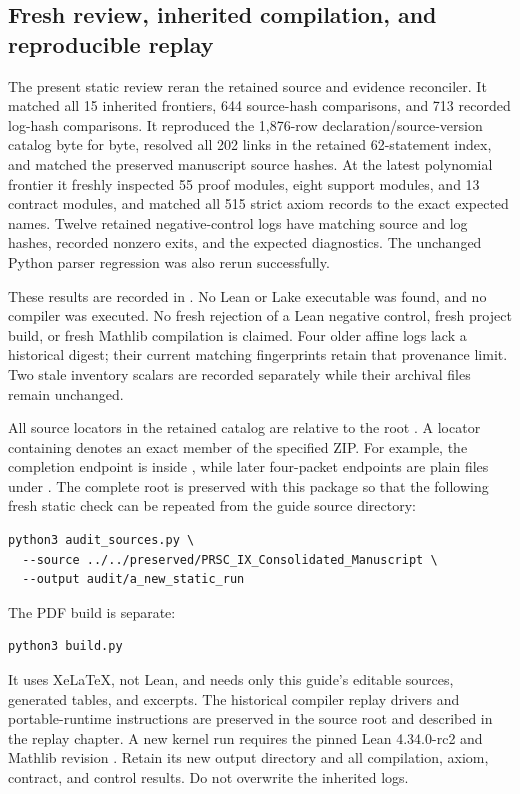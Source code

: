 \subsection{Fresh review, inherited compilation, and reproducible replay}
The present static review reran the retained source and evidence reconciler. It matched all 15 inherited frontiers, 644 source-hash comparisons, and 713 recorded log-hash comparisons. It reproduced the 1,876-row declaration/source-version catalog byte for byte, resolved all 202 links in the retained 62-statement index, and matched the preserved manuscript source hashes. At the latest polynomial frontier it freshly inspected 55 proof modules, eight support modules, and 13 contract modules, and matched all 515 strict axiom records to the exact expected names. Twelve retained negative-control logs have matching source and log hashes, recorded nonzero exits, and the expected diagnostics. The unchanged Python parser regression was also rerun successfully.

These results are recorded in . No Lean or Lake executable was found, and no compiler was executed. No fresh rejection of a Lean negative control, fresh project build, or fresh Mathlib compilation is claimed. Four older affine logs lack a historical digest; their current matching fingerprints retain that provenance limit. Two stale inventory scalars are recorded separately while their archival files remain unchanged.

All source locators in the retained catalog are relative to the root . A locator containing \code{!} denotes an exact member of the specified ZIP. For example, the completion endpoint is inside , while later four-packet endpoints are plain files under . The complete root is preserved with this package so that the following fresh static check can be repeated from the guide source directory:
\begin{Verbatim}[fontsize=\small,breaklines=true,breakanywhere=true]
python3 audit_sources.py \
  --source ../../preserved/PRSC_IX_Consolidated_Manuscript \
  --output audit/a_new_static_run
\end{Verbatim}

The PDF build is separate:
\begin{Verbatim}[fontsize=\small,breaklines=true,breakanywhere=true]
python3 build.py
\end{Verbatim}
It uses XeLaTeX, not Lean, and needs only this guide's editable sources, generated tables, and excerpts. The historical compiler replay drivers and portable-runtime instructions are preserved in the source root and described in the replay chapter. A new kernel run requires the pinned Lean 4.34.0-rc2 and Mathlib revision . Retain its new output directory and all compilation, axiom, contract, and control results. Do not overwrite the inherited logs.

